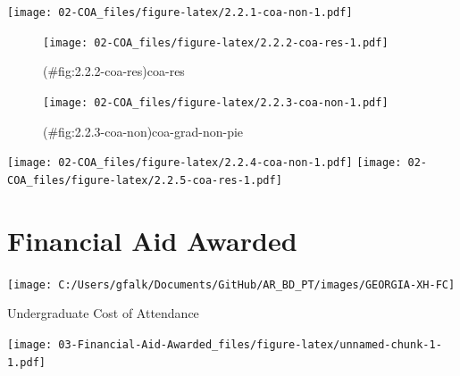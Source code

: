 \documentclass[
]{book}
\begin{document}
\texttt{[image: 02-COA\_files/figure-latex/2.2.1-coa-non-1.pdf]}

\begin{figure}
\centering
\texttt{[image: 02-COA\_files/figure-latex/2.2.2-coa-res-1.pdf]}
\caption{(\#fig:2.2.2-coa-res)coa-res}
\end{figure}

\begin{figure}
\centering
\texttt{[image: 02-COA\_files/figure-latex/2.2.3-coa-non-1.pdf]}
\caption{(\#fig:2.2.3-coa-non)coa-grad-non-pie}
\end{figure}

\texttt{[image: 02-COA\_files/figure-latex/2.2.4-coa-non-1.pdf]}
\texttt{[image: 02-COA\_files/figure-latex/2.2.5-coa-res-1.pdf]}

\hypertarget{financial-aid-awarded}{%
\chapter{Financial Aid Awarded}\label{financial-aid-awarded}}

\texttt{[image: C:/Users/gfalk/Documents/GitHub/AR\_BD\_PT/images/GEORGIA-XH-FC]}

Undergraduate Cost of Attendance

\texttt{[image: 03-Financial-Aid-Awarded\_files/figure-latex/unnamed-chunk-1-1.pdf]}
\end{document}
